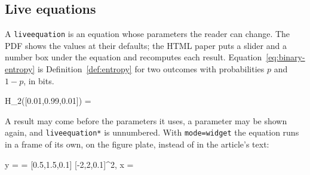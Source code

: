 \documentclass{article}
\theoremstyle{definition}
\begin{document}
\subsection{Live equations}
A \verb|liveequation| is an equation whose parameters the reader can
change. The PDF shows the values at their defaults; the HTML paper puts a
slider and a number box under the equation and recomputes each result.
Equation~\eqref{eq:binary-entropy} is Definition~\ref{def:entropy} for two
outcomes with probabilities $p$ and $1-p$, in bits.
\begin{liveequation}[id=eq-binary-entropy,
    alt={Binary entropy in bits at a probability p the reader can change}]
  H_2([0.01,0.99,0.01])
    = \ 
  \label{eq:binary-entropy}
\end{liveequation}
A result may come before the parameters it uses, a parameter may be
shown again, and \verb|liveequation*| is unnumbered. With
\verb|mode=widget| the equation runs in a frame of its own, on the
figure plate, instead of in the article's text:
\begin{liveequation*}[id=eq-parabola, mode=widget,
    alt={A parabola y = a x squared with live a and x}]
  y = 
    = [0.5,1.5,0.1] \cdot {}[-2,2,0.1]^2,
  \qquad x = 
\end{liveequation*}
\end{document}

